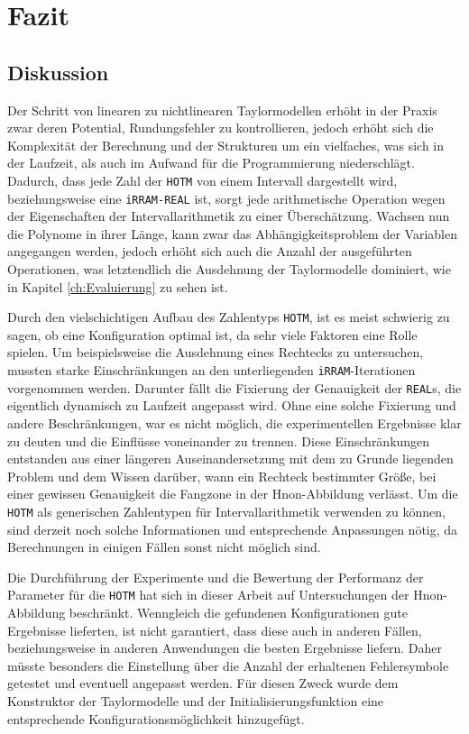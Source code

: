 
\chapter{Fazit}
\label{ch:fazit}

\section{Diskussion}
Der Schritt von linearen zu nichtlinearen Taylormodellen erhöht in der Praxis zwar deren Potential, Rundungsfehler zu kontrollieren, jedoch erhöht sich die Komplexität der Berechnung und der Strukturen um ein vielfaches, was sich in der Laufzeit, als auch im Aufwand für die Programmierung niederschlägt. Dadurch, dass jede Zahl der \verb+HOTM+ von einem Intervall dargestellt wird, beziehungsweise eine \verb+iRRAM-REAL+ ist, sorgt jede arithmetische Operation wegen der Eigenschaften der Intervallarithmetik zu einer Überschätzung. Wachsen nun die Polynome in ihrer Länge, kann zwar das Abhängigkeitsproblem der Variablen angegangen werden, jedoch erhöht sich auch die Anzahl der ausgeführten Operationen, was letztendlich die Ausdehnung der Taylormodelle dominiert, wie in Kapitel \ref{ch:Evaluierung} zu sehen ist. 

Durch den vielschichtigen Aufbau des Zahlentyps \verb+HOTM+, ist es meist schwierig zu sagen, ob eine Konfiguration optimal ist, da sehr viele Faktoren eine Rolle spielen. Um beispielsweise die Ausdehnung eines Rechtecks zu untersuchen, mussten starke Einschränkungen an den unterliegenden \verb+iRRAM+-Iterationen vorgenommen werden. Darunter fällt die Fixierung der Genauigkeit der \verb+REAL+s, die eigentlich dynamisch zu Laufzeit angepasst wird. Ohne eine solche Fixierung und andere Beschränkungen, war es nicht möglich, die experimentellen Ergebnisse klar zu deuten und die Einflüsse voneinander zu trennen. Diese Einschränkungen entstanden aus einer längeren Auseinandersetzung mit dem zu Grunde liegenden Problem und dem Wissen darüber, wann ein Rechteck bestimmter Größe, bei einer gewissen Genauigkeit die Fangzone in der H\e non-Abbildung verlässt. Um die \verb+HOTM+ als generischen Zahlentypen für Intervallarithmetik verwenden zu können, sind derzeit noch solche Informationen und entsprechende Anpassungen nötig, da Berechnungen in einigen Fällen sonst nicht möglich sind.


Die Durchführung der Experimente und die Bewertung der Performanz der Parameter für die \verb+HOTM+ hat sich in dieser Arbeit auf Untersuchungen der H\e non-Abbildung beschränkt. Wenngleich die gefundenen Konfigurationen gute Ergebnisse lieferten, ist nicht garantiert, dass diese auch in anderen Fällen, beziehungsweise in anderen Anwendungen die besten Ergebnisse liefern. Daher müsste besonders die Einstellung über die Anzahl der erhaltenen Fehlersymbole getestet und eventuell angepasst werden. Für diesen Zweck wurde dem Konstruktor der Taylormodelle und der Initialisierungsfunktion eine entsprechende Konfigurationsmöglichkeit hinzugefügt. 

